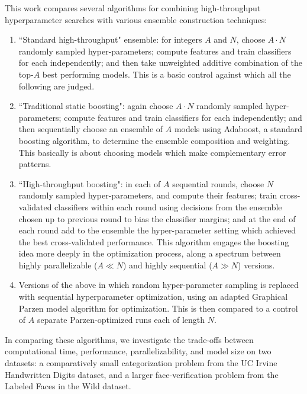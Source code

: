 \documentclass[11pt,twocolumn]{article}
\begin{document}
This work compares several algorithms for combining high-throughput hyperparameter searches with various ensemble construction techniques: 
\begin{enumerate}
\item ``Standard high-throughput" ensemble:  for integers $A$ and $N$, choose $A \cdot N$ randomly sampled hyper-parameters; compute features and train classifiers for each independently; and then take unweighted additive combination of the top-$A$ best performing models.  This is a basic control against which all the following are judged. 
\item ``Traditional static boosting":  again choose $A \cdot N$ randomly sampled hyper-parameters; compute features and train classifiers for each independently; and then sequentially choose an ensemble of $A$ models using Adaboost, a standard boosting algorithm, to determine the ensemble composition and weighting.   This basically is about choosing models which make complementary error patterns.  
\item ``High-throughput boosting":  in each of $A$ sequential rounds, choose $N$ randomly sampled hyper-parameters, and compute their features; train cross-validated classifiers within each round using decisions from the ensemble chosen up to previous round to bias the classifier margins; and at the end of each round add to the ensemble the hyper-parameter setting which achieved the best cross-validated performance.   This algorithm engages the boosting idea more deeply in the optimization process, along a spectrum between highly parallelizable ($A \ll N$) and highly sequential ($A \gg N$) versions.
\item Versions of the above in which random hyper-parameter sampling is replaced with sequential hyperparameter optimization, using an adapted Graphical Parzen model algorithm for optimization.   This is then compared to a control of $A$ separate Parzen-optimized runs each of length $N$.
\end{enumerate}

In comparing these algorithms, we investigate the trade-offs between computational time, performance, parallelizability, and model size on two datasets:  a comparatively small categorization problem from the UC Irvine Handwritten Digits dataset, and a larger face-verification problem from the Labeled Faces in the Wild dataset. 
\end{document}
